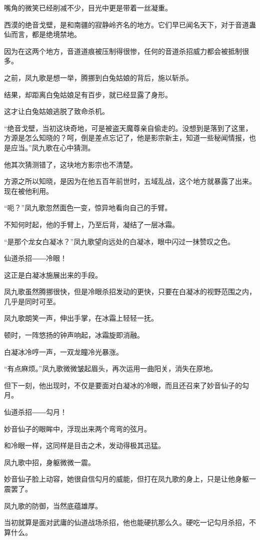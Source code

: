 \begin{this_body}
嘴角的微笑已经削减不少，目光中更是带着一丝凝重。

西漠的绝音戈壁，是和南疆的寂静岭齐名的地方。它们早已闻名天下，对于音道蛊仙而言，都是绝境禁地。

因为在这两个地方，音道道痕被压制得很惨，任何的音道杀招威力都会被抵制很多。

之前，凤九歌是想一举，腾挪到白兔姑娘的背后，施以斩杀。

结果，却距离白兔姑娘足有百步，就已经显露了身形。

这才让白兔姑娘逃脱了致命杀机。

“绝音戈壁，当初这块奇地，可是被盗天魔尊亲自偷走的。没想到是落到了这里，方源是怎么知晓的？呵，倒是差点忘记了，他是影宗新主，知道一些秘闻情报，也是应当。”凤九歌在心中猜测。

他其次猜测错了，这块地方影宗也不清楚。

方源之所以知晓，是因为在他五百年前世时，五域乱战，这个地方就暴露了出来。现在被他利用。

“呃？”凤九歌忽然面色一变，惊异地看向自己的手臂。

不知何时起，他的手臂上，乃至后背，凝结了一层冰霜。

“是那个龙女白凝冰？”凤九歌望向远处的白凝冰，眼中闪过一抹赞叹之色。

仙道杀招――冷眼！

这正是白凝冰施展出来的手段。

凤九歌虽然腾挪很快，但是冷眼杀招发动的更快，只要在白凝冰的视野范围之内，几乎是同时可至。

凤九歌朗笑一声，伸出手掌，在冰霜上轻轻一抚。

顿时，一阵悠扬的钟声响起，冰霜旋即消融。

白凝冰冷哼一声，一双龙瞳冷光暴涨。

“有点麻烦。”凤九歌微微皱起眉头，再次运用一曲阳关，消失在原地。

但下一刻，他出现时，不仅是要面对白凝冰的冷眼，而且还召来了妙音仙子的勾月。

仙道杀招――勾月！

妙音仙子的眼眸中，浮现出来两个弯弯的弦月。

和冷眼一样，这同样是目击之术，发动得极其迅猛。

凤九歌中招，身躯微微一震。

妙音仙子脸上动容，她很自信勾月的威能，但打在凤九歌的身上，只是让他身躯一震罢了。

凤九歌的防御，当然底蕴雄厚。

当初就算是面对武庸的仙道战场杀招，他也能硬抗那么久。硬吃一记勾月杀招，不算什么。


\end{this_body}
